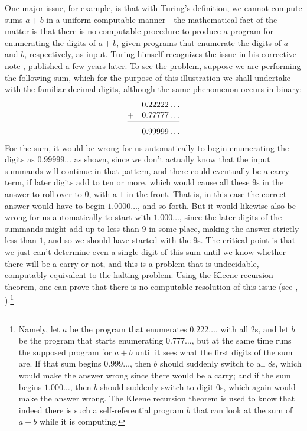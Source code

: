 \documentclass[12pt]{amsart}
\begin{document}
One major issue, for example, is that with Turing's definition, we cannot compute sums $a+b$ in a uniform computable manner---the mathematical fact of the matter is that there is no computable procedure to produce a program for enumerating the digits of $a+b$, given programs that enumerate the digits of $a$ and $b$, respectively, as input. Turing himself recognizes the issue in his corrective note \cite{Turing1938:On-computable-numbers-a-correction}, published a few years later. To see the problem, suppose we are performing the following sum, which for the purpose of this illustration we shall undertake with the familiar decimal digits, although the same phenomenon occurs in binary:
\begin{align*}
        &0.22222\ldots \\[-2pt]
 +\quad &0.77777\ldots \\[-10pt]
   \cline{1-2}
        &0.99999\ldots
\end{align*}
For the sum, it would be wrong for us automatically to begin enumerating the digits as $0.99999\ldots$ as shown, since we don't actually know that the input summands will continue in that pattern, and there could eventually be a carry term, if later digits add to ten or more, which would cause all these $9$s in the answer to roll over to $0$, with a $1$ in the front. That is, in this case the correct answer would have to begin $1.0000\ldots$, and so forth. But it would likewise also be wrong for us automatically to start with $1.000\ldots$, since the later digits of the summands might add up to less than $9$ in some place, making the answer strictly less than $1$, and so we should have started with the $9$s. The critical point is that we just can't determine even a single digit of this sum until we know whether there will be a carry or not, and this is a problem that is undecidable, computably equivalent to the halting problem. Using the Kleene recursion theorem, one can prove that there is no computable resolution of this issue (see \cite{Hamkins.blog2018:Alan-Turing-on-computable-numbers}, \cite[\S6.6]{Hamkins2021:Lectures-on-the-philosophy-of-mathematics}).\footnote{Namely, let $a$ be the program that enumerates $0.222\ldots$, with all $2$s, and let $b$ be the program that starts enumerating $0.777\ldots$, but at the same time runs the supposed program for $a+b$ until it sees what the first digits of the sum are. If that sum begins $0.999\ldots$, then $b$ should suddenly switch to all $8$s, which would make the answer wrong since there would be a carry; and if the sum begins $1.000\ldots$, then $b$ should suddenly switch to digit $0$s, which again would make the answer wrong. The Kleene recursion theorem is used to know that indeed there is such a self-referential program $b$ that can look at the sum of $a+b$ while it is computing.}
\end{document}
